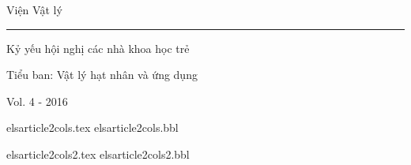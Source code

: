 \documentclass[final, 5p,12pt]{elsarticle}
\begin{document}
\begin{titlepage} 


\begin{center}
\bfseries
{\Large Viện Vật lý\\
\rule{0.6\textwidth}{1.pt}} 

\vfill

{\Huge Kỷ yếu hội nghị các nhà khoa học trẻ} 

\vfill

{\Large  Tiểu ban: Vật lý hạt nhân và ứng dụng} 

\vfill

{\large Vol. 4 - 2016}
\end{center} 
\end{titlepage}

\clearpage
 


%

{elsarticle2cols.tex} 
{elsarticle2cols.bbl}

{elsarticle2cols2.tex} 
{elsarticle2cols2.bbl} 
\end{document}
